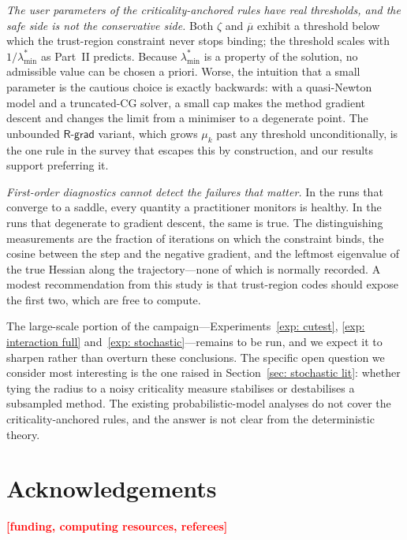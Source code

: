 \documentclass[11pt]{article}
\theoremstyle{plain}
\theoremstyle{definition}
\theoremstyle{remark}
\numberwithin{equation}{section}
\newcommand{\Rgrad}{\textsf{R-grad}}
\newcommand{\TODO}[1]{\textcolor{red}{\textbf{[#1]}}}
\begin{document}
\emph{The user parameters of the criticality-anchored rules have real thresholds, and the safe
side is not the conservative side.} Both $\zeta$ and $\overline{\mu}$ exhibit a threshold below
which the trust-region constraint never stops binding; the threshold scales with
$1/\lambda^*_{\min}$ as Part~II predicts. Because $\lambda^*_{\min}$ is a property of the
solution, no admissible value can be chosen a priori. Worse, the intuition that a small
parameter is the cautious choice is exactly backwards: with a quasi-Newton model and a
truncated-CG solver, a small cap makes the method gradient descent and changes the limit from a
minimiser to a degenerate point. The unbounded $\Rgrad$ variant, which grows $\mu_k$ past any
threshold unconditionally, is the one rule in the survey that escapes this by construction, and
our results support preferring it.

\emph{First-order diagnostics cannot detect the failures that matter.} In the runs that converge
to a saddle, every quantity a practitioner monitors is healthy. In the runs that degenerate to
gradient descent, the same is true. The distinguishing measurements are the fraction of
iterations on which the constraint binds, the cosine between the step and the negative gradient,
and the leftmost eigenvalue of the true Hessian along the trajectory---none of which is normally
recorded. A modest recommendation from this study is that trust-region codes should expose the
first two, which are free to compute.

The large-scale portion of the campaign---Experiments~\ref{exp: cutest},
\ref{exp: interaction full} and~\ref{exp: stochastic}---remains to be run, and we expect it to
sharpen rather than overturn these conclusions. The specific open question we consider most
interesting is the one raised in Section~\ref{sec: stochastic lit}: whether tying the radius to
a noisy criticality measure stabilises or destabilises a subsampled method. The existing
probabilistic-model analyses do not cover the criticality-anchored rules, and the answer is not
clear from the deterministic theory.

\section*{Acknowledgements}

\TODO{funding, computing resources, referees}
\end{document}
